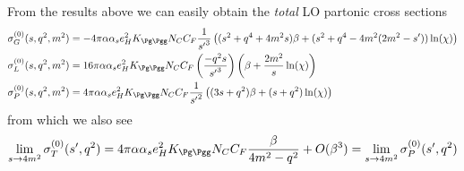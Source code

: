 From the results above we can easily obtain the \textit{total} LO partonic cross sections
\begin{align}
\sigma_G^{(0)}(s,q^2,m^2) &=-4\pi\alpha\alpha_s e_H^2 K_{\Pg\Pgg}N_CC_F\frac 1 {{s'}^3}\left((s^2+q^4+4m^2 s)\beta + (s^2+q^4-4m^2(2m^2-s'))\ln(\chi)\right)\\
\sigma_L^{(0)}(s,q^2,m^2) &=16\pi\alpha\alpha_s e_H^2 K_{\Pg\Pgg}N_CC_F\left(\frac{-q^2s}{{s'}^3}\right)\left(\beta + \frac{2m^2}{s}\ln(\chi)\right)\\
\sigma_P^{(0)}(s,q^2,m^2) &=4\pi\alpha\alpha_s e_H^2 K_{\Pg\Pgg}N_CC_F\frac 1 {{s'}^2}\left((3s+q^2)\beta + (s+q^2)\ln(\chi)\right)
\end{align}
from which we also see
\begin{equation}
\lim_{s\rightarrow 4m^2} \sigma_T^{(0)}(s',q^2) = 4\pi\alpha\alpha_s e_H^2 K_{\Pg\Pgg}N_CC_F\frac{\beta}{4m^2-q^2} + O(\beta^3) = \lim_{s\rightarrow 4m^2} \sigma_P^{(0)}(s',q^2)
\end{equation}
